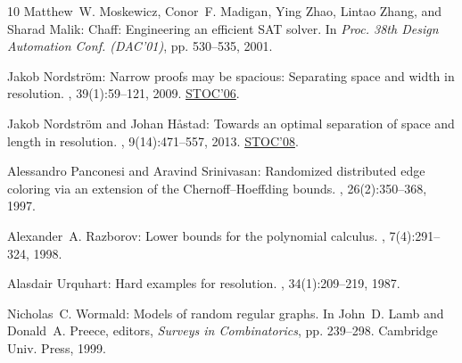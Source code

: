 \documentclass[11pt]{article}
\numberwithin{equation}{section}
\theoremstyle{definition}
\theoremstyle{plain}
\begin{document}
\begin{thebibliography}{10}
{\sc Matthew~W. Moskewicz, Conor~F. Madigan, Ying Zhao, Lintao Zhang, and
  Sharad Malik}: Chaff: {E}ngineering an efficient {SAT} solver.
\newblock In {\em Proc. 38th Design Automation Conf. (DAC'01)}, pp. 530--535,
  2001.
\newblock [\epfmtdoi{10.1145/378239.379017}]

{\sc Jakob Nordstr\"om}: Narrow proofs may be spacious: Separating space and
  width in resolution.
, 39(1):59--121, 2009.
\newblock \prelim \href{https://doi.org/10.1145/1132516.1132590}{STOC'06}.
\newblock [\epfmtdoi{10.1137/060668250}]

{\sc Jakob Nordström and Johan H{\aa}stad}: Towards an optimal separation of
  space and length in resolution.
, 9(14):471--557, 2013.
\newblock \prelim \href{https://doi.org/10.1145/1374376.1374478}{STOC'08}.

{\sc Alessandro Panconesi and Aravind Srinivasan}: Randomized distributed edge
  coloring via an extension of the {C}hernoff--{H}oeffding bounds.
, 26(2):350--368, 1997.
\newblock [\epfmtdoi{10.1137/S0097539793250767}]

{\sc Alexander~A. Razborov}: Lower bounds for the polynomial calculus.
, 7(4):291--324, 1998.
\newblock [\epfmtdoi{10.1007/s000370050013}]

{\sc Alasdair Urquhart}: Hard examples for resolution.
, 34(1):209--219, 1987.
\newblock [\epfmtdoi{10.1145/7531.8928}]

{\sc Nicholas~C. Wormald}: Models of random regular graphs.
\newblock In {\sc John~D. Lamb and Donald~A. Preece}, editors, {\em Surveys in
  Combinatorics}, pp. 239--298. Cambridge Univ. Press, 1999.

\end{thebibliography}
\end{document}
